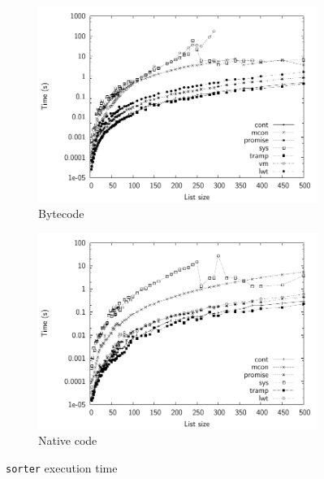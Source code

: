 \documentclass[12pt,twoside,notitlepage]{report}
\theoremstyle{plain}%
\theoremstyle{definition}
\theoremstyle{remark}
\begin{document}
\begin{figure}[h]
\centering
\begin{subfigure}[b]{0.45\linewidth}
\includegraphics[width=\linewidth]{./sorter_exec_times_bw}
\caption{Bytecode}
\label{fig:sorter_exec_times_bc}
\end{subfigure}
\begin{subfigure}[b]{0.45\linewidth}
\includegraphics[width=\linewidth]{./sorter_exec_times_opt_bw}
\caption{Native code}
\label{fig:sorter_exec_times_nat}
\end{subfigure}
\cprotect\caption{\verb|sorter| execution time}
\label{fig:sorter_exec_times}
\end{figure}
\end{document}
